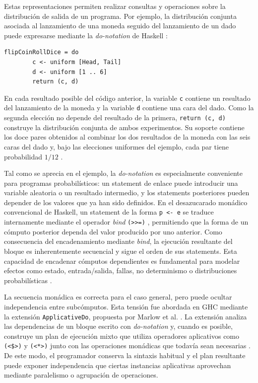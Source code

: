 Estas representaciones permiten realizar consultas y operaciones sobre la distribución de salida de un programa. Por ejemplo, la distribución conjunta asociada al lanzamiento de una moneda seguido del lanzamiento de un dado puede expresarse mediante la \textit{do-notation} de \textsf{Haskell} \cite{ErwigKollmansberger2006}:

\begin{lstlisting}[style=haskell, caption={Programa probabilístico que modela el lanzamiento conjunto de una moneda y un dado de seis caras mediante la \textit{do-notation} de \textsf{Haskell}.}, label={lst:coin-dice-example}]
    flipCoinRollDice = do 
        c <- uniform [Head, Tail]
        d <- uniform [1 .. 6]
        return (c, d)
\end{lstlisting}

En cada resultado posible del código anterior, la variable \verb|c| contiene un resultado del lanzamiento de la moneda y la variable \verb|d| contiene una cara del dado. Como la segunda elección no depende del resultado de la primera, \verb|return (c, d)| construye la distribución conjunta de ambos experimentos. Su soporte contiene los doce pares obtenidos al combinar los dos resultados de la moneda con las seis caras del dado y, bajo las elecciones uniformes del ejemplo, cada par tiene probabilidad $1/12$ \cite{ErwigKollmansberger2006}.

Tal como se aprecia en el ejemplo, la \textit{do-notation} es especialmente conveniente para programas probabilísticos: un statement de enlace puede introducir una variable aleatoria o un resultado intermedio, y los statements posteriores pueden depender de los valores que ya han sido definidos. En el desazucarado monádico convencional de \textsf{Haskell}, un statement de la forma \verb|p <- e| se traduce internamente mediante el operador \textit{bind} \verb|(>>=)| \cite[sección~3.14]{Haskell2010}, permitiendo que la forma de un cómputo posterior dependa del valor producido por uno anterior. Como consecuencia del encadenamiento mediante \textit{bind}, la ejecución resultante del bloque es inherentemente secuencial y sigue el orden de sus statements. Esta capacidad de encadenar cómputos dependientes es fundamental para modelar efectos como estado, entrada/salida, fallas, no determinismo o distribuciones probabilísticas \cite{Wadler1995,ErwigKollmansberger2006}.

La secuencia monádica es correcta para el caso general, pero puede ocultar independencia entre subcómputos. Esta tensión fue abordada en \textsf{GHC} mediante la extensión \texttt{ApplicativeDo}, propuesta por Marlow et al. \cite{MarlowPJKM2016}. La extensión analiza las dependencias de un bloque escrito con \textit{do-notation} y, cuando es posible, construye un plan de ejecución mixto que utiliza operadores aplicativos como \verb|(<$>)| y \verb|(<*>)| junto con las operaciones monádicas que todavía sean necesarias \cite{MarlowPJKM2016,GHCApplicativeDo}. De este modo, el programador conserva la sintaxis habitual y el plan resultante puede exponer independencia que ciertas instancias aplicativas aprovechan mediante paralelismo o agrupación de operaciones.

